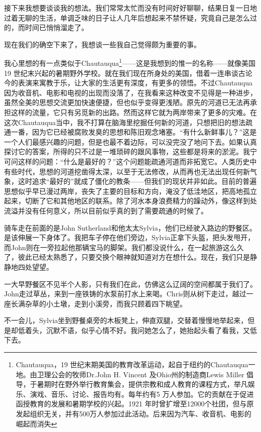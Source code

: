 \documentclass[UTF8]{article}
\begin{document}
\par 接下来我想要谈谈我的想法。我们常常太忙而没有时间好好聊聊，结果日复一日地过着无聊的生活，单调乏味的日子让人几年后想起来不禁怀疑，究竟自己是怎么过的，而时间已悄悄溜走了。
\par 现在我们的确空下来了，我想谈一些我自己觉得颇为重要的事。
\par 我心里想的有一点类似于Chautauqua\footnote{Chautauqua，19 世纪末期美国的教育改革运动，起自于纽约的Chautauqua一地。由卫理公会的牧师Dr.John H. Vincent 及Ohio州的制造商Lewis Miller 倡导，于暑期时在野外举行教育集会，提供宗教和成人教育的课程方式，举凡娱乐、演戏、音乐、讨论、报告均有。每年约有5 万人参加。它的贡献在于促进函授教育的发展和暑期学校的兴起。1921 年时曾扩增至12000个社团，但与原发起组织无关，并有500万人参加过此活动。后来因为汽车、收音机、电影的崛起而消失}——这是我想到的惟一的名称——就像美国19 世纪末兴起的暑期野外学校。就在我们现在所身处的美国，借着一连串谈古论今的表演来寓教于乐，让大家的生活更有深度，有更多的领悟。不过Chautauqua因为收音机、电影和电视的出现而没落了，在我看来这种改变不见得是一种进步，虽然全美的思想交流更加快速便捷，但也似乎变得更浅陋。原先的河道已无法再承担这样的流量，它只有另觅新的出路。然而这样它就为两岸带来了更多的灾难。在这次Chautauqua当中，我不打算在脑海里挖掘任何新的河道，只想把旧的想法疏通一番，因为它已经被腐败发臭的思想和陈旧观念堵塞。“有什么新鲜事儿？”这是一个人们最感兴趣的问题，但是也最不着边际，可以没完没了地问下去。如果认真探讨它的答案，所得的只不过是一堆琐碎的跟风事物，这些都是将来的淤泥。我宁可问这样的问题：“什么是最好的？”这个问题能疏通河道而非拓宽它。人类历史中有些时代，思想的河道挖凿得太深，以至于无法修改，从而再也无法出现任何新气象，这时追求“最好的”就成了僵化的教条——但我们的现状并非如此。目前的普遍思想似乎早已漫过两岸，丧失了主要的目标和方向，淹没了低洼地区，把高地孤立起来，切断了它和其他地区的联系。除了河水本身浪费精力的躁动外，像这样到处流溢并没有任何意义，所以目前似乎真的到了需要疏通的时候了。
\par 骑车走在前面的是John Sutherland和他太太Sylvia，他们已经驶入路边的野餐区。是该伸展一下身体了。我把车子停在他们旁边，Sylvia正拿下头盔，把头发甩开，而John则在一旁拉起他那辆宝马的脚架。我们都没说什么，在一起旅游这么久了，彼此已经太熟悉了，只要交换个眼神就知道对方在想什么。现在，我们只是静静地四处望望。
\par 一大早野餐区不见半个人影，只有我们在此，仿佛这么辽阔的空间都属于我们了。John走过草丛，来到一座铁铸的水泵前打水上来喝。Chris则从树下走过，越过一座长满杂草的小土墩，走到小溪旁，而我只顾着四下眺望。
\par 不一会儿，Sylvia坐到野餐桌旁的木板凳上，伸直双腿，交替着慢慢地举起来，但是却低着头，沉默不语，似乎心情不好。我问她怎么了，她抬起头看了看我，又低下去。
\end{document}
